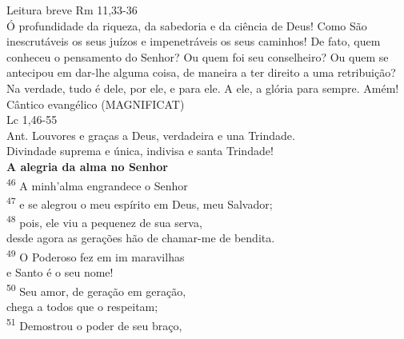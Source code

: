 \documentclass{book}
\begin{document}
\begin{center}
    \textcolor{VioletRed2}{Leitura breve Rm 11,33-36}
    \vspace{.2cm} \\
    Ó profundidade da riqueza, da sabedoria e da ciência de Deus! Como São inescrutáveis os seus juízos e impenetráveis os seus caminhos! De fato, quem conheceu o pensamento do Senhor? Ou quem foi seu conselheiro? Ou quem se antecipou em dar-lhe alguma coisa, de maneira a ter direito a uma retribuição? Na verdade, tudo é dele, por ele, e para ele. A ele, a glória para sempre. Amém!
    \newpage
    \textcolor{VioletRed2}{Cântico evangélico (MAGNIFICAT) \\ Lc 1,46-55}
    \vspace{.2cm} \\
    \textcolor{VioletRed2}{Ant.} Louvores e graças a Deus, verdadeira e una Trindade. \\
    Divindade suprema e única, indivisa e santa Trindade!
    \vspace{.2cm} \\
    \textbf{A alegria da alma no Senhor}
    \vspace{.2cm} \\
    \textsuperscript{\underline{\hspace{.07in}}\textcolor{VioletRed2}{46}} A minh'alma engrandece o Senhor \textsuperscript{\gresixstar{}} \\
    \textsuperscript{\textcolor{VioletRed2}{47}} e se alegrou o meu espírito em Deus, meu Salvador; \\
    \textsuperscript{\underline{\hspace{.07in}}\textcolor{VioletRed2}{48}} pois, ele viu a pequenez de sua serva, \textsuperscript{\gresixstar{}}\\
    desde agora as gerações hão de chamar-me de bendita.
    \vspace{.2cm} \\
    \textsuperscript{\underline{\hspace{.07in}}\textcolor{VioletRed2}{49}} O Poderoso fez em im maravilhas \textsuperscript{\gresixstar{}} \\
    e Santo é o seu nome! \\
    \textsuperscript{\underline{\hspace{.07in}}\textcolor{VioletRed2}{50}} Seu amor, de geração em geração, \textsuperscript{\gresixstar{}} \\
    chega a todos que o respeitam;
    \vspace{.2cm} \\
    \textsuperscript{\underline{\hspace{.07in}}\textcolor{VioletRed2}{51}} Demostrou o poder de seu braço, \textsuperscript{\gresixstar{}} \\

\end{center}
\end{document}
